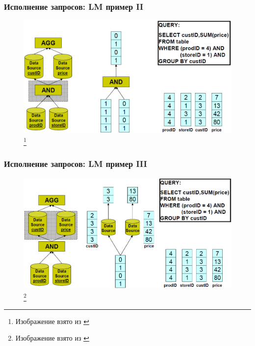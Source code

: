 \documentclass{beamer}
\begin{document}
\begin{frame}
\frametitle{Исполнение запросов: LM пример II}

\begin{figure}[htb]
\includegraphics[width=\textwidth,height=0.75\textheight,keepaspectratio]{lm2.png} 
\footnote{\tiny{Изображение взято из \cite{Harizopoulos2009}}}
 \end{figure}    

\end{frame}

\begin{frame}
\frametitle{Исполнение запросов: LM пример III}

\begin{figure}[htb]
\includegraphics[width=\textwidth,height=0.75\textheight,keepaspectratio]{lm3.png} 
\footnote{\tiny{Изображение взято из \cite{Harizopoulos2009}}}
 \end{figure}    

\end{frame}
\end{document}
